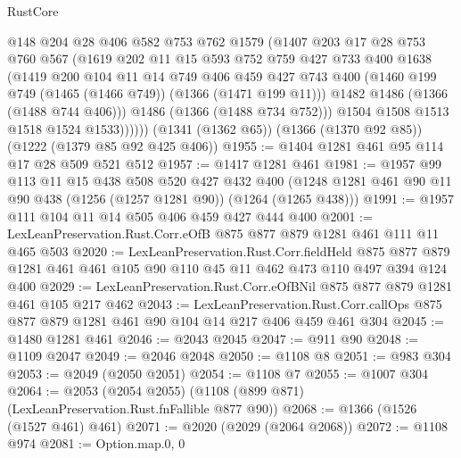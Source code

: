 \begin{lexlean}{RustCore}
\begin{coremodule}
              @148
              @204
              @28
              @406
              @582
              @753
              @762
              @1579
              (@1407
                @203
                @17
                @28
                @753
                @760
                @567
                (@1619
                  @202
                  @11
                  @15
                  @593
                  @752
                  @759
                  @427
                  @733
                  @400
                  @1638
                  (@1419
                    @200
                    @104
                    @11
                    @14
                    @749
                    @406
                    @459
                    @427
                    @743
                    @400
                    (@1460 @199 @749 (@1465 (@1466 @749)) (@1366 (@1471 @199 @11)))
                    @1482
                    @1486
                    (@1366 (@1488 @744 @406)))
                  @1486
                  (@1366 (@1488 @734 @752)))
                @1504
                @1508
                @1513
                @1518
                @1524
                @1533))))))
    (@1341 (@1362 @65))
    (@1366 (@1370 @92 @85))
    (@1222 (@1379 @85 @92 @425 @406))
@1955 := @1404 @1281 @461 @95 @114 @17 @28 @509 @521 @512
@1957 := @1417 @1281 @461
@1981 := @1957
    @99
    @113
    @11
    @15
    @438
    @508
    @520
    @427
    @432
    @400
    (@1248 @1281 @461 @90 @11 @90 @438 (@1256 (@1257 @1281 @90)) (@1264 (@1265 @438)))
@1991 := @1957 @111 @104 @11 @14 @505 @406 @459 @427 @444 @400
@2001 := LexLeanPreservation.Rust.Corr.eOfB @875 @877 @879 @1281 @461 @111 @11 @465 @503
@2020 := LexLeanPreservation.Rust.Corr.fieldHeld
    @875
    @877
    @879
    @1281
    @461
    @461
    @105
    @90
    @110
    @45
    @11
    @462
    @473
    @110
    @497
    @394
    @124
    @400
@2029 := LexLeanPreservation.Rust.Corr.eOfBNil @875 @877 @879 @1281 @461 @105 @217 @462
@2043 := LexLeanPreservation.Rust.Corr.callOps
    @875
    @877
    @879
    @1281
    @461
    @90
    @104
    @14
    @217
    @406
    @459
    @461
    @304
@2045 := @1480 @1281 @461
@2046 := @2043 @2045
@2047 := @911 @90
@2048 := @1109 @2047
@2049 := @2046 @2048
@2050 := @1108 @8
@2051 := @983 @304
@2053 := @2049 (@2050 @2051)
@2054 := @1108 @7
@2055 := @1007 @304
@2064 := @2053 (@2054 @2055) (@1108 (@899 @871) (LexLeanPreservation.Rust.fnFallible @877 @90))
@2068 := @1366 (@1526 (@1527 @461) @461)
@2071 := @2020 (@2029 (@2064 @2068))
@2072 := @1108 @974
@2081 := Option.map.{0, 0}

\end{coremodule}
\end{lexlean}
